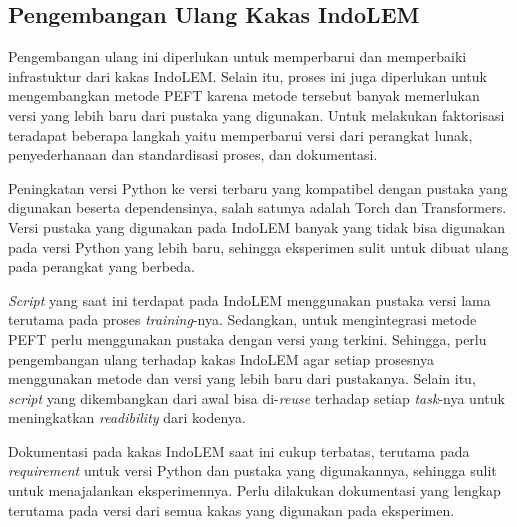 \subsection{Pengembangan Ulang Kakas IndoLEM}

Pengembangan ulang ini diperlukan untuk memperbarui dan memperbaiki infrastuktur dari kakas IndoLEM. Selain itu, proses ini juga diperlukan untuk mengembangkan metode PEFT karena metode tersebut banyak memerlukan versi yang lebih baru dari pustaka yang digunakan. Untuk melakukan faktorisasi teradapat beberapa langkah yaitu memperbarui versi dari perangkat lunak, penyederhanaan dan standardisasi proses, dan dokumentasi.

Peningkatan versi Python ke versi terbaru yang kompatibel dengan pustaka yang digunakan beserta dependensinya, salah satunya adalah Torch dan Transformers. Versi pustaka yang digunakan pada IndoLEM banyak yang tidak bisa digunakan pada versi Python yang lebih baru, sehingga eksperimen sulit untuk dibuat ulang pada perangkat yang berbeda. 

\textit{Script} yang saat ini terdapat pada IndoLEM menggunakan pustaka versi lama terutama pada proses \textit{training}-nya. Sedangkan, untuk mengintegrasi metode PEFT perlu menggunakan pustaka dengan versi yang terkini. Sehingga, perlu pengembangan ulang terhadap kakas IndoLEM agar setiap prosesnya menggunakan metode dan versi yang lebih baru dari pustakanya. Selain itu, \textit{script} yang dikembangkan dari awal bisa di-\textit{reuse} terhadap setiap \textit{task}-nya untuk meningkatkan \textit{readibility} dari kodenya.

Dokumentasi pada kakas IndoLEM saat ini cukup terbatas, terutama pada \textit{requirement} untuk versi Python dan pustaka yang digunakannya, sehingga sulit untuk menajalankan eksperimennya. Perlu dilakukan dokumentasi yang lengkap terutama pada versi dari semua kakas yang digunakan pada eksperimen.
